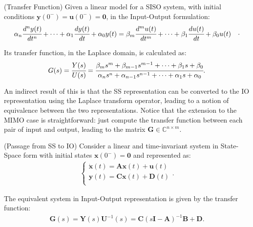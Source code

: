 \documentclass[a4paper,11pt]{book}
\numberwithin{figure}{chapter}
\numberwithin{equation}{chapter}
\numberwithin{table}{chapter}
\newtheorem{theorem}{Theorem}[chapter]
\theoremstyle{definition}
\newcounter{boxed-theorem}
\newenvironment{boxed-theorem}[1]
{\begin{shaded} \begin{theorem}{#1}}
{\end{theorem} \end{shaded}}
\newcounter{boxed-definition}
\begin{document}
\begin{boxed-theorem}{(Transfer Function)} \label{th:transFun01}
    Given a linear model for a SISO system, with initial conditions $\bm{y}(0^-) = \bm{u}(0^-) = \bm{0}$, in the Input-Output formulation:
    \begin{equation}
    \begin{split}
        \alpha_n \cfrac{d^n y(t)}{dt^n} + \cdots + \alpha_{1} \cfrac{d y(t)}{dt} + \alpha_{0} y(t) &= \beta_m \cfrac{d^m u(t)}{dt^m} + \cdots + \beta_{1} \cfrac{d u(t)}{dt} + \beta_{0} u(t)
    \end{split}
    .\end{equation}
    
    Its transfer function, in the Laplace domain, is calculated as:
    \begin{equation} \label{eq:transFun01}
         G(s) = \cfrac{Y(s)}{U(s)} = \cfrac{\beta_m s^m + \beta_{m-1} s^{m-1} + \cdots + \beta_{1} s + \beta_0}{\alpha_n s^n + \alpha_{n-1} s^{n-1} + \cdots + \alpha_{1} s + \alpha_0}
    .\end{equation}
\end{boxed-theorem}

An indirect result of this is that the SS representation can be converted to the IO representation using the Laplace transform operator, leading to a notion of equivalence between the two representations. Notice that the extension to the MIMO case is straightforward: just compute the transfer function between each pair of input and output, leading to the matrix $\bm{G} \in \mathbb{C}^{n \times m}$.

\begin{boxed-theorem}{(Passage from SS to IO)} \label{th:SSToIO}
    Consider a linear and time-invariant system in State-Space form with initial states $\bm{x}(0^-) = \bm{0}$ and represented as:
    \begin{align}
    \begin{cases}
        \dot{\bm{x}}(t) = \bm{A} \bm{x}(t) + \bm{u}(t) \\
        \bm{y}(t) = \bm{C} \bm{x}(t) + \bm{D}(t) \\
    \end{cases}     
    .\end{align}
    
    The equivalent system in Input-Output representation is given by the transfer function:
    \begin{align}
    \bm{G}(s) = \bm{Y}(s)\bm{U}^{-1}(s) = \bm{C} (s\bm{I} - \bm{A})^{-1} \bm{B} + \bm{D}
    .\end{align}
\end{boxed-theorem}
 
\end{document}
